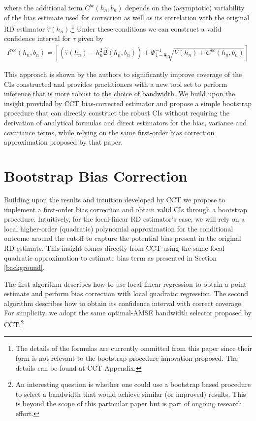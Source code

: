 \documentclass[12pt,fleqn]{article}
\begin{document}
where the additional term $C^{bc}(h_{n}, b_{n})$ depends on the (asymptotic) variability of the bias estimate used for correction as well as its correlation with the original RD estimator $\hat{\tau}(h_{n})$.\footnote{The details of the formulas are currently ommitted from this paper since their form is not relevant to the bootstrap procedure innovation proposed. The details can be found at CCT Appendix.}  Under these conditions we can construct a valid confidence interval for $\tau$ given by
 \begin{align}
  I^{rbc}(h_{n}, b_{n})=\left[\left(\hat{\tau}(h_{n})-h_{n}^{2}\hat{\mathsf{B}}(h_{n},b_{n})\right)\pm \Phi^{-1}_{1-\frac{\alpha}{2}}\sqrt{V(h_{n})+C^{bc}(h_{n}, b_{n})} \right]
 \end{align}

This approach is shown by the authors to significantly improve coverage of the CIs constructed and provides practitioners with a new tool set to perform inference that is more robust to the choice of bandwidth. We build upon the insight provided by CCT bias-corrected estimator and propose a simple bootstrap procedure that can directly construct the robust CIs without requiring the derivation of analytical formulas and direct estimators for the bias, variance and covariance terms, while relying on the same first-order bias correction approximation proposed by that paper.

\section{Bootstrap Bias Correction}\label{boot}

Building upon the results and intuition developed by CCT we propose to implement a first-order bias correction and obtain valid CIs through a bootstrap procedure.
Intuitively, for the local-linear RD estimator's case, we will rely on a local higher-order (quadratic) polynomial approximation for the conditional outcome around the cutoff to capture the potential bias present in the original RD estimate. This insight comes directly from CCT using the same local quadratic approximation to estimate bias term as presented in Section \ref{background}.

The first algorithm describes how to use local linear regression to obtain a point estimate and perform bias correction with local quadratic regression. The second algorithm describes how to obtain its confidence interval with correct coverage. For simplicity, we adopt the same optimal-AMSE bandwidth selector proposed by CCT.\footnote{An interesting question is whether one could use a bootstrap based procedure to select a bandwidth that would achieve similar (or improved) results. This is beyond the scope of this particular paper but is part of ongoing research effort.} 
\end{document}
